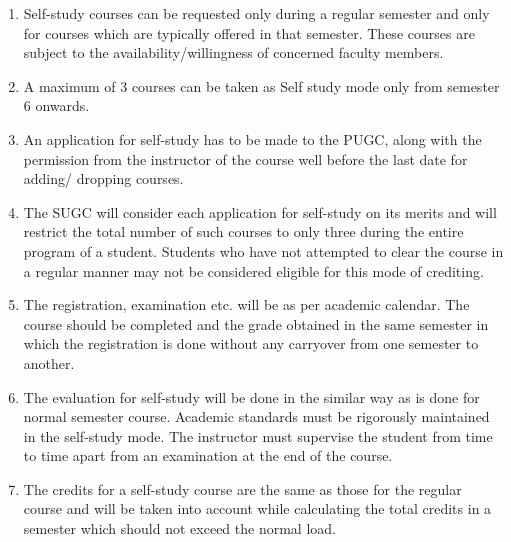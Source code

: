 \begin{enumerate} [leftmargin=15mm]
    \item Self-study courses can be requested only during a regular semester and only for courses which are typically offered in that semester. These courses are subject to the availability/willingness of concerned faculty members.
    \item A maximum of 3 courses can be taken as Self study mode only from semester 6 onwards.
    \item An application for self-study has to be made to the PUGC, along with the permission from the instructor of the course well before the last date for adding/ dropping courses. 
    \item The SUGC will consider each application for self-study on its merits and will restrict the total number of such courses to only three during the entire program of a student. Students who have not attempted to clear the course in a regular manner may not be considered eligible for this mode of crediting. 
    \item The registration, examination etc. will be as per academic calendar. The course should be completed and the grade obtained in the same semester in which the registration is done without any carryover from one semester to another. 
    \item The evaluation for self-study will be done in the similar way as is done for normal semester course. Academic standards must be rigorously maintained in the self-study mode. The instructor must supervise the student from time to time apart from an examination at the end of the course.
    \item The credits for a self-study course are the same as those for the regular course and will be taken into account while calculating the total credits in a semester which should not exceed the normal load. 
\end{enumerate}

